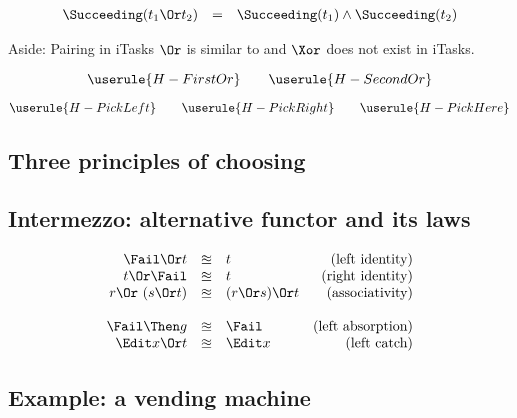 \begin{equation*}
  \begin{array}{lcl}
    \Succeeding(t_1 \Or t_2) &=& \Succeeding(t_1) \land \Succeeding(t_2)
  \end{array}
\end{equation*}

\begin{margintext}{Aside: Pairing in iTasks}
  $\Or$ is similar to \type{-||-}
  and $\Xor$ does not exist in iTasks.
\end{margintext}

\begin{equation*}
  \userule{H-FirstOr} \qquad \userule{H-SecondOr}
\end{equation*}

\begin{equation*}
  \userule{H-PickLeft} \qquad \userule{H-PickRight} \qquad \userule{H-PickHere}
\end{equation*}


\subsection{Three principles of choosing}


\subsection{Intermezzo: alternative functor and its laws}

\begin{equation*}
  \begin{array}{rclr}
    \Fail \Or t
      &\approxeq& t
      & \text{(left identity)} \\
    t \Or \Fail
      &\approxeq& t
      & \text{(right identity)} \\
    r \Or\ (s \Or t)
      &\approxeq& (r \Or s) \Or t
      & \text{(associativity)} \\
    & & & \\
    \Fail \Then g
      &\approxeq& \Fail
      & \text{(left absorption)} \\
    \Edit x \Or t
      &\approxeq& \Edit x
      & \text{(left catch)}
  \end{array}
\end{equation*}



\subsection{Example: a vending machine}

